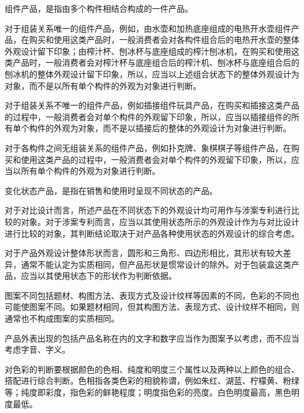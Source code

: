组件产品，是指由多个构件相结合构成的一件产品。

对于组装关系唯一的组件产品，例如，由水壶和加热底座组成的电热开水壶组件产品，在购买和使用这类产品时，一般消费者会对各构件组合后的电热开水壶的整体外观设计留下印象；由榨汁杯、刨冰杯与底座组成的榨汁刨冰机，在购买和使用这类产品时，一般消费者会对榨汁杯与底座组合后的榨汁机、刨冰杯与底座组合后的刨冰机的整体外观设计留下印象，所以，应当以上述组合状态下的整体外观设计为对象，而不是以所有单个构件的外观为对象进行判断。

对于组装关系不唯一的组件产品，例如插接组件玩具产品，在购买和插接这类产品的过程中，一般消费者会对单个构件的外观留下印象，所以，应当以插接组件的所有单个构件的外观为对象，而不是以插接后的整体的外观设计为对象进行判断。

对于各构件之间无组装关系的组件产品，例如扑克牌、象棋棋子等组件产品，在购买和使用这类产品的过程中，一般消费者会对单个构件的外观留下印象，所以，应当以所有单个构件的外观为对象进行判断。

变化状态产品，是指在销售和使用时呈现不同状态的产品。

对于对比设计而言，所述产品在不同状态下的外观设计均可用作与涉案专利进行比较的对象。对于涉案专利而言，应当以其使用状态所示的外观设计作为与对比设计进行比较的对象，其判断结论取决于对产品各种使用状态的外观设计的综合考虑。

对于产品外观设计整体形状而言，圆形和三角形、四边形相比，其形状有较大差异，通常不能认定为实质相同，但产品形状是惯常设计的除外。对于包装盒这类产品，应当以其使用状态下的形状作为判断依据。

图案不同包括题材、构图方法、表现方式及设计纹样等因素的不同，色彩的不同也可能使图案不同。如果题材相同，但其构图方法、表现方式、设计纹样不相同，则通常也不构成图案的实质相同。

产品外表出现的包括产品名称在内的文字和数字应当作为图案予以考虑，而不应当考虑字音、字义。

对色彩的判断要根据颜色的色相、纯度和明度三个属性以及两种以上颜色的组合、搭配进行综合判断。色相指各类色彩的相貌称谓，例如朱红、湖蓝、柠檬黄、粉绿等；纯度即彩度，指色彩的鲜艳程度；明度指色彩的亮度。白色明度最高，黑色明度最低。

